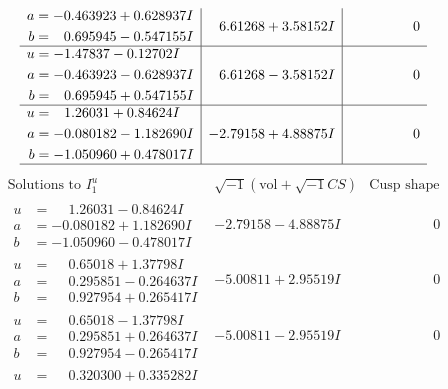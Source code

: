 \documentclass[1p]{elsarticle_modified}
\theoremstyle{definition}
\newcommand{\I}{\sqrt{-1}}
\begin{document}
$$\begin{array}{c|c|c}
\begin{aligned}
a &= -0.463923 + 0.628937 I \\
b &= \phantom{-}0.695945 - 0.547155 I\end{aligned}
 & \phantom{-}6.61268 + 3.58152 I & \phantom{-0.000000 } 0 \\ \hline\begin{aligned}
u &= -1.47837 - 0.12702 I \\
a &= -0.463923 - 0.628937 I \\
b &= \phantom{-}0.695945 + 0.547155 I\end{aligned}
 & \phantom{-}6.61268 - 3.58152 I & \phantom{-0.000000 } 0 \\ \hline\begin{aligned}
u &= \phantom{-}1.26031 + 0.84624 I \\
a &= -0.080182 - 1.182690 I \\
b &= -1.050960 + 0.478017 I\end{aligned}
 & -2.79158 + 4.88875 I & \phantom{-0.000000 } 0\\
 \hline 
 \end{array}$$\newpage$$\begin{array}{c|c|c}  
\text{Solutions to }I^u_{1}& \I (\text{vol} + \sqrt{-1}CS) & \text{Cusp shape}\\
 \hline 
\begin{aligned}
u &= \phantom{-}1.26031 - 0.84624 I \\
a &= -0.080182 + 1.182690 I \\
b &= -1.050960 - 0.478017 I\end{aligned}
 & -2.79158 - 4.88875 I & \phantom{-0.000000 } 0 \\ \hline\begin{aligned}
u &= \phantom{-}0.65018 + 1.37798 I \\
a &= \phantom{-}0.295851 - 0.264637 I \\
b &= \phantom{-}0.927954 + 0.265417 I\end{aligned}
 & -5.00811 + 2.95519 I & \phantom{-0.000000 } 0 \\ \hline\begin{aligned}
u &= \phantom{-}0.65018 - 1.37798 I \\
a &= \phantom{-}0.295851 + 0.264637 I \\
b &= \phantom{-}0.927954 - 0.265417 I\end{aligned}
 & -5.00811 - 2.95519 I & \phantom{-0.000000 } 0 \\ \hline\begin{aligned}
u &= \phantom{-}0.320300 + 0.335282 I \\

\end{aligned}
\end{array}$$
\end{document}
